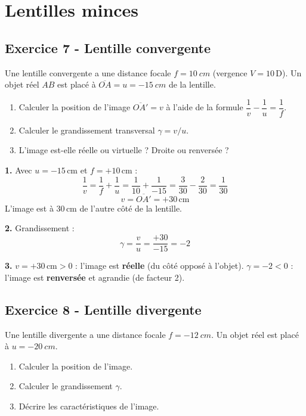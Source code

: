\documentclass[12pt,a4paper]{article}
\begin{document}
\newpage
\section{Lentilles minces}

\subsection*{Exercice 7 - Lentille convergente \niveau{\facile}}

\begin{boiteexercice}
Une lentille convergente a une distance focale $f = \qty{10}{cm}$ (vergence $V = 10\,\text{D}$).
Un objet réel $AB$ est placé à $\overline{OA} = u = -\qty{15}{cm}$ de la lentille.
\begin{enumerate}
  \item Calculer la position de l'image $\overline{OA'} = v$ à l'aide de la formule $\dfrac{1}{v} - \dfrac{1}{u} = \dfrac{1}{f}$.
  \item Calculer le grandissement transversal $\gamma = v/u$.
  \item L'image est-elle réelle ou virtuelle ? Droite ou renversée ?
\end{enumerate}
\end{boiteexercice}

\begin{boitecorrige}
\textbf{1.} Avec $u = -15\,\text{cm}$ et $f = +10\,\text{cm}$ :
\[
\frac{1}{v} = \frac{1}{f} + \frac{1}{u} = \frac{1}{10} + \frac{1}{-15} = \frac{3}{30} - \frac{2}{30} = \frac{1}{30}
\]
\[
\boxed{v = \overline{OA'} = +30\,\text{cm}}
\]
L'image est à $30\,\text{cm}$ de l'autre côté de la lentille.

\textbf{2.} Grandissement :
\[
\gamma = \frac{v}{u} = \frac{+30}{-15} = -2
\]

\textbf{3.} $v = +30\,\text{cm} > 0$ : l'image est \textbf{réelle} (du côté opposé à l'objet). $\gamma = -2 < 0$ : l'image est \textbf{renversée} et agrandie (de facteur 2).
\end{boitecorrige}

\subsection*{Exercice 8 - Lentille divergente \niveau{\facile}}

\begin{boiteexercice}
Une lentille divergente a une distance focale $f = -\qty{12}{cm}$. Un objet réel est placé à $u = -\qty{20}{cm}$.
\begin{enumerate}
  \item Calculer la position de l'image.
  \item Calculer le grandissement $\gamma$.
  \item Décrire les caractéristiques de l'image.
\end{enumerate}
\end{boiteexercice}
\end{document}
